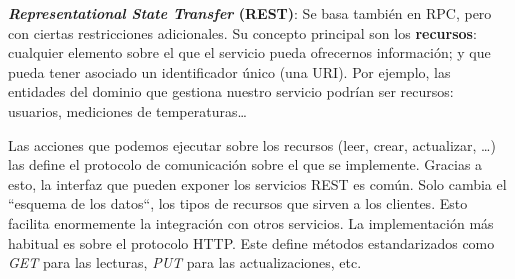 \textbf{\emph{Representational State Transfer} (REST)}: Se basa también en RPC, pero con ciertas restricciones adicionales. \cite{taylorSoftwareArchitectureFoundations2009} Su concepto principal son los \textbf{recursos}: cualquier elemento sobre el que el servicio pueda ofrecernos información; y que pueda tener asociado un identificador único (una URI). \cite{richardsonRESTfulWebServices2007} Por ejemplo, las entidades del dominio que gestiona nuestro servicio podrían ser recursos: usuarios, mediciones de temperaturas\dots

Las acciones que podemos ejecutar sobre los recursos (leer, crear, actualizar, \dots) las define el protocolo de comunicación sobre el que se implemente. Gracias a esto, la interfaz que pueden exponer los servicios REST es común. Solo cambia el ``esquema de los datos``, los tipos de recursos que sirven a los clientes. Esto facilita enormemente la integración con otros servicios. \cite{nallyRESTVsRPC2018} La implementación más habitual es sobre el protocolo HTTP. Este define métodos estandarizados como \emph{GET} para las lecturas, \emph{PUT} para las actualizaciones, etc.

